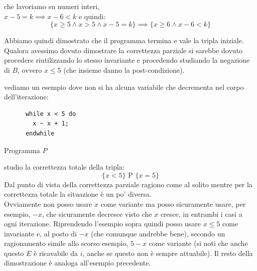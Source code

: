 \begin{esempio}
\begin{enumerate}
				      						      che lavoriamo su numeri interi, \\
				      						      $x-5=k\implies x-6<k$ e quindi:
				      						      \[\{x\geq 5\land x>5\land x-5=k\}\implies \{x\geq 6\land x-6 < k\}\]
				      					\end{enumerate}
				      					Abbiamo quindi dimostrato che il programma termina e vale la tripla
				      					iniziale.\\
				      					Qualora avessimo dovuto dimostrare la correttezza parziale si sarebbe dovuto
				      					procedere riutilizzando lo stesso invariante e procedendo studiando la
				      					negazione di $B$, ovvero $x\leq 5$ (che insieme danno la post-condizione).
				      				\end{esempio}
				      				\begin{esempio}
				      					vediamo un esempio dove non si ha alcuna variabile che decrementa nel corpo
				      					dell'iterazione:
				      					\begin{listing}[H]
				      						\begin{lstlisting}
      while x < 5 do
        x ~ x + 1;
      endwhile  
				      						\end{lstlisting}
				      						\caption{Programma $P$}
				      						\label{E:ti}
				      					\end{listing}
				      					studio la correttezza totale della tripla:
				      					\[\{x<5\}\mbox{ P }\{x=5\}\]
				      					Dal punto di vista della correttezza parziale ragiono come al solito mentre
				      					per la correttezza totale la situazione è un po' diversa.\\
				      					Ovviamente non posso usare $x$ come variante ma posso sicuramente usare, per
				      					esempio, $-x$, che sicuramente decresce visto che $x$ cresce, in entrambi i
				      					casi a ogni iterazione. Riprendendo l'esempio sopra quindi posso usare $x\leq
				      					5$ come invariante e, al posto di $-x$ (che comunque andrebbe bene), secondo un
				      					ragionamento simile allo scorso esempio, $5-x$ come variante (si noti che
				      					anche questo $E$ è ricavabile da $i$, anche se questo non è sempre attuabile).
				      					Il resto della dimostrazione è analoga all'esempio precedente.
				      				\end{esempio}
